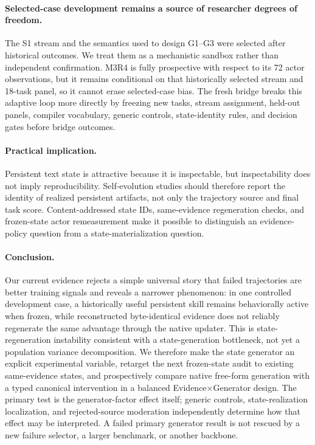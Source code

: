 \paragraph{Selected-case development remains a source of researcher degrees of freedom.}
The S1 stream and the semantics used to design G1--G3 were selected after historical outcomes. We treat them as a mechanistic sandbox rather than independent confirmation. M3R4 is fully prospective with respect to its 72 actor observations, but it remains conditional on that historically selected stream and 18-task panel, so it cannot erase selected-case bias. The fresh bridge breaks this adaptive loop more directly by freezing new tasks, stream assignment, held-out panels, compiler vocabulary, generic controls, state-identity rules, and decision gates before bridge outcomes.

\paragraph{Practical implication.}
Persistent text state is attractive because it is inspectable, but inspectability does not imply reproducibility. Self-evolution studies should therefore report the identity of realized persistent artifacts, not only the trajectory source and final task score. Content-addressed state IDs, same-evidence regeneration checks, and frozen-state actor remeasurement make it possible to distinguish an evidence-policy question from a state-materialization question.

\paragraph{Conclusion.}
Our current evidence rejects a simple universal story that failed trajectories are better training signals and reveals a narrower phenomenon: in one controlled development case, a historically useful persistent skill remains behaviorally active when frozen, while reconstructed byte-identical evidence does not reliably regenerate the same advantage through the native updater. This is state-regeneration instability consistent with a state-generation bottleneck, not yet a population variance decomposition. We therefore make the state generator an explicit experimental variable, retarget the next frozen-state audit to existing same-evidence states, and prospectively compare native free-form generation with a typed canonical intervention in a balanced Evidence$\times$Generator design. The primary test is the generator-factor effect itself; generic controls, state-realization localization, and rejected-source moderation independently determine how that effect may be interpreted. A failed primary generator result is not rescued by a new failure selector, a larger benchmark, or another backbone.

